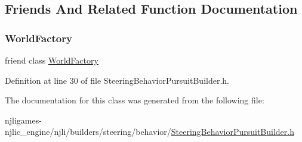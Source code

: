 \subsection{Friends And Related Function Documentation}
\mbox{\label{classnjli_1_1_steering_behavior_pursuit_builder_acb96ebb09abe8f2a37a915a842babfac}} 
\subsubsection{\texorpdfstring{World\+Factory}{WorldFactory}}
{\footnotesize\ttfamily friend class \mbox{\hyperlink{classnjli_1_1_world_factory}{World\+Factory}}\hspace{0.3cm}{\ttfamily [friend]}}



Definition at line 30 of file Steering\+Behavior\+Pursuit\+Builder.\+h.



The documentation for this class was generated from the following file\+:\begin{DoxyCompactItemize}
\item 
njligames-\/njlic\+\_\+engine/njli/builders/steering/behavior/\mbox{\hyperlink{_steering_behavior_pursuit_builder_8h}{Steering\+Behavior\+Pursuit\+Builder.\+h}}\end{DoxyCompactItemize}
